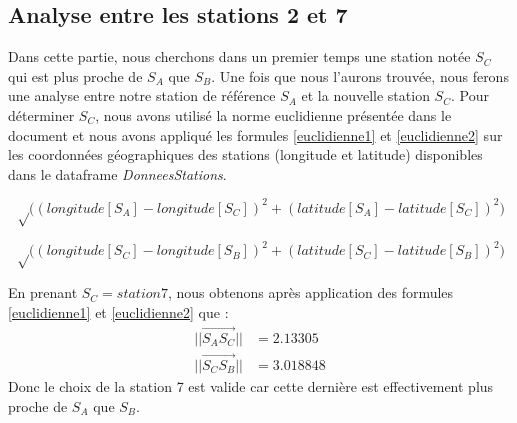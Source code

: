\documentclass[a4paper,french,10pt]{article}
\begin{document}
\subsection{Analyse entre les stations 2 et 7}
Dans cette partie, nous cherchons dans un premier temps une station notée $S_C$ qui est plus proche de $S_A$ que $S_B$. Une fois que nous l'aurons trouvée, nous ferons une analyse entre notre station de référence $S_A$ et la nouvelle station $S_C$.
Pour déterminer $S_C$, nous avons utilisé la norme euclidienne présentée dans le document \cite{norme_euclid} et nous avons appliqué les formules \ref{euclidienne1} et \ref{euclidienne2} sur les coordonnées géographiques des stations (longitude et latitude) disponibles dans le dataframe \textit{DonneesStations}.

\begin{equation}
	\label{euclidienne1}
	\sqrt \Big(  (longitude[S_A] - longitude[S_C])^2 + (latitude[S_A] - latitude[S_C])^2 \Big)
\end{equation}

\begin{equation}
	\label{euclidienne2}
	\sqrt \Big(  (longitude[S_C] - longitude[S_B])^2 + (latitude[S_C] - latitude[S_B])^2 \Big)
\end{equation}

En prenant $S_C = station7$, nous obtenons après application des formules \ref{euclidienne1} et \ref{euclidienne2} que :
\begin{align*}
	|| \overrightarrow{S_A S_C} || &=  2.13305 \\
	|| \overrightarrow{S_C S_B} || &=  3.018848
\end{align*}
Donc le choix de la station 7 est valide car cette dernière est effectivement plus proche de $S_A$ que $S_B$.

\vspace{3mm}
\end{document}
